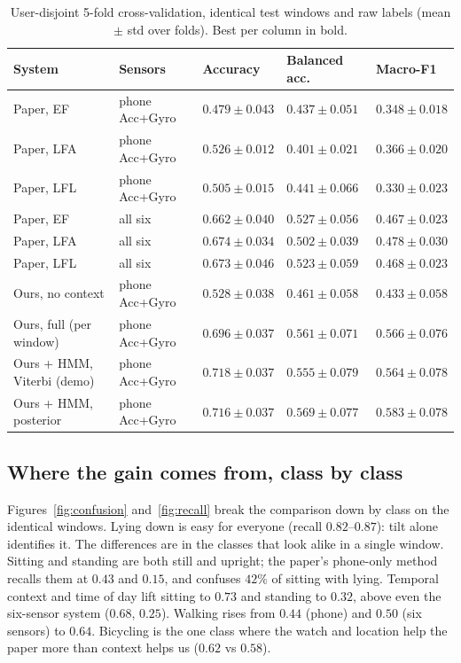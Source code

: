\documentclass[11pt,a4paper]{article}
\begin{document}
\begin{table}[H]
\centering\small
\caption{User-disjoint 5-fold cross-validation, identical test windows and raw labels
(mean $\pm$ std over folds). Best per column in bold.}
\label{tab:main}
\begin{tabularx}{\textwidth}{@{}l l YYY@{}}
\toprule
System & Sensors & Accuracy & Balanced acc. & Macro-F1 \\
\midrule
Paper, EF  & phone Acc+Gyro & $0.479\pm0.043$ & $0.437\pm0.051$ & $0.348\pm0.018$ \\
Paper, LFA & phone Acc+Gyro & $0.526\pm0.012$ & $0.401\pm0.021$ & $0.366\pm0.020$ \\
Paper, LFL & phone Acc+Gyro & $0.505\pm0.015$ & $0.441\pm0.066$ & $0.330\pm0.023$ \\
\addlinespace
Paper, EF  & all six        & $0.662\pm0.040$ & $0.527\pm0.056$ & $0.467\pm0.023$ \\
Paper, LFA & all six        & $0.674\pm0.034$ & $0.502\pm0.039$ & $0.478\pm0.030$ \\
Paper, LFL & all six        & $0.673\pm0.046$ & $0.523\pm0.059$ & $0.468\pm0.023$ \\
\midrule
Ours, no context            & phone Acc+Gyro & $0.528\pm0.038$ & $0.461\pm0.058$ & $0.433\pm0.058$ \\
Ours, full (per window)     & phone Acc+Gyro & $0.696\pm0.037$ & $0.561\pm0.071$ & $0.566\pm0.076$ \\
Ours + HMM, Viterbi (demo)  & phone Acc+Gyro & $\mathbf{0.718\pm0.037}$ & $0.555\pm0.079$ & $0.564\pm0.078$ \\
Ours + HMM, posterior       & phone Acc+Gyro & $0.716\pm0.037$ & $\mathbf{0.569\pm0.077}$ & $\mathbf{0.583\pm0.078}$ \\
\bottomrule
\end{tabularx}
\end{table}

\subsection{Where the gain comes from, class by class}

Figures~\ref{fig:confusion} and~\ref{fig:recall} break the comparison down by class on
the identical windows. Lying down is easy for everyone (recall $0.82$--$0.87$): tilt
alone identifies it. The differences are in the classes that look alike in a single
window. Sitting and standing are both still and upright; the paper's phone-only method
recalls them at $0.43$ and $0.15$, and confuses $42\%$ of sitting with lying. Temporal
context and time of day lift sitting to $0.73$ and standing to $0.32$, above even the
six-sensor system ($0.68$, $0.25$). Walking rises from $0.44$ (phone) and $0.50$ (six
sensors) to $0.64$. Bicycling is the one class where the watch and location help the
paper more than context helps us ($0.62$ vs $0.58$).
\end{document}
